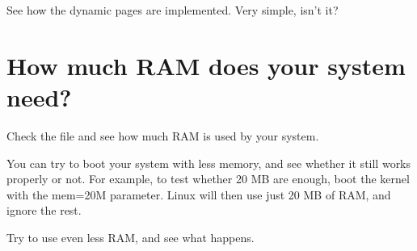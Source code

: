 See how the dynamic pages are implemented. Very simple, isn't it?

\section{How much RAM does your system need?}

Check the  file and see how much RAM is used by your
system.

You can try to boot your system with less memory, and see whether it
still works properly or not. For example, to test whether 20 MB are
enough, boot the kernel with the mem=20M parameter. Linux will then
use just 20 MB of RAM, and ignore the rest.

Try to use even less RAM, and see what happens.
